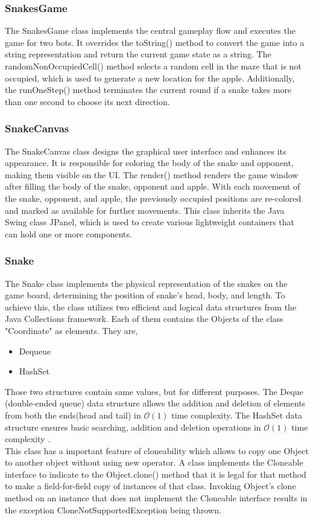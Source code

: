 \documentclass[a4paper,12pt]{article}
\begin{document}
\subsubsection{SnakesGame}
The SnakesGame class implements the central gameplay flow and executes the game for two bots.
It overrides the toString() method to convert the game into a string representation and return the current game state as a string.
The randomNonOccupiedCell() method selects a random cell in the maze that is not occupied, which is used to generate a new location for the apple.
Additionally, the runOneStep() method terminates the current round if a snake takes more than one second to choose its next direction.

\subsubsection{SnakeCanvas}
The SnakeCanvas class designs the graphical user interface and enhances its appearance. It is responsible for coloring the body of the snake and opponent, making them visible on the UI.
The render() method renders the game window after filling the body of the snake, opponent and apple.
With each movement of the snake, opponent, and apple, the previously occupied positions are re-colored and marked as available for further movements.
This class inherits the Java Swing class JPanel, which is used to create various lightweight containers that can hold one or more components.
\subsubsection{Snake}
The Snake class implements the physical representation of the snakes on the game board, determining the position of snake's head, body, and length.
To achieve this, the class utilizes two efficient and logical data structures from the Java Collections framework. Each of them contains the Objects of the class "Coordinate" as elements. They are,
\begin{itemize}
\item Dequeue
\item HashSet
\end{itemize}
Those two structures contain same values, but for different purposes.
The Deque (double-ended queue) data structure allows the addition and deletion of elements from both the ends(head and tail) in $\mathcal{O}(1)$ time complexity. 
The HashSet data structure ensures basic searching, addition and deletion operations in $\mathcal{O}(1)$ time complexity .\\
This class has a important feature of cloneability which allows to copy one Object to another object without using new operator.
A class implements the Cloneable interface to indicate to the Object.clone() method that it is legal for that method to make a field-for-field copy of instances of that class.
Invoking Object's clone method on an instance that does not implement the Cloneable interface results in the exception CloneNotSupportedException being thrown.\cite{Cloneable}
\end{document}
